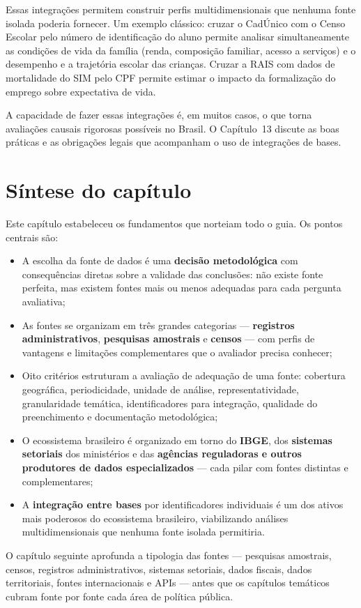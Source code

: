 Essas integrações permitem construir perfis multidimensionais que nenhuma fonte isolada poderia fornecer. Um exemplo clássico: cruzar o CadÚnico com o Censo Escolar pelo número de identificação do aluno permite analisar simultaneamente as condições de vida da família (renda, composição familiar, acesso a serviços) e o desempenho e a trajetória escolar das crianças. Cruzar a RAIS com dados de mortalidade do SIM pelo CPF permite estimar o impacto da formalização do emprego sobre expectativa de vida.

A capacidade de fazer essas integrações é, em muitos casos, o que torna avaliações causais rigorosas possíveis no Brasil. O Capítulo~13 discute as boas práticas e as obrigações legais que acompanham o uso de integrações de bases.

\section{Síntese do capítulo}

Este capítulo estabeleceu os fundamentos que norteiam todo o guia. Os pontos centrais são:

\begin{itemize}
  \item A escolha da fonte de dados é uma \textbf{decisão metodológica} com consequências diretas sobre a validade das conclusões: não existe fonte perfeita, mas existem fontes mais ou menos adequadas para cada pergunta avaliativa;

  \item As fontes se organizam em três grandes categorias --- \textbf{registros administrativos}, \textbf{pesquisas amostrais} e \textbf{censos} --- com perfis de vantagens e limitações complementares que o avaliador precisa conhecer;

  \item Oito critérios estruturam a avaliação de adequação de uma fonte: cobertura geográfica, periodicidade, unidade de análise, representatividade, granularidade temática, identificadores para integração, qualidade do preenchimento e documentação metodológica;

  \item O ecossistema brasileiro é organizado em torno do \textbf{IBGE}, dos \textbf{sistemas setoriais} dos ministérios e das \textbf{agências reguladoras e outros produtores de dados especializados} --- cada pilar com fontes distintas e complementares;

  \item A \textbf{integração entre bases} por identificadores individuais é um dos ativos mais poderosos do ecossistema brasileiro, viabilizando análises multidimensionais que nenhuma fonte isolada permitiria.
\end{itemize}

\medskip

O capítulo seguinte aprofunda a tipologia das fontes --- pesquisas amostrais, censos, registros administrativos, sistemas setoriais, dados fiscais, dados territoriais, fontes internacionais e APIs --- antes que os capítulos temáticos cubram fonte por fonte cada área de política pública.